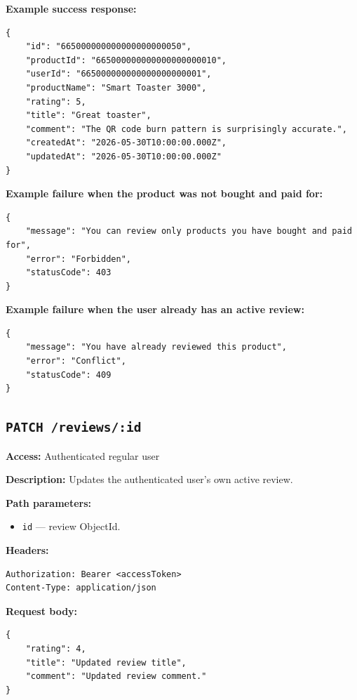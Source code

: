\pagebreak
\textbf{Example success response:}

\begin{verbatim}
{
    "id": "665000000000000000000050",
    "productId": "665000000000000000000010",
    "userId": "665000000000000000000001",
    "productName": "Smart Toaster 3000",
    "rating": 5,
    "title": "Great toaster",
    "comment": "The QR code burn pattern is surprisingly accurate.",
    "createdAt": "2026-05-30T10:00:00.000Z",
    "updatedAt": "2026-05-30T10:00:00.000Z"
}
\end{verbatim}

\textbf{Example failure when the product was not bought and paid for:}

\begin{verbatim}
{
    "message": "You can review only products you have bought and paid for",
    "error": "Forbidden",
    "statusCode": 403
}
\end{verbatim}

\textbf{Example failure when the user already has an active review:}

\begin{verbatim}
{
    "message": "You have already reviewed this product",
    "error": "Conflict",
    "statusCode": 409
}
\end{verbatim}

\subsection{\texttt{PATCH /reviews/:id}}

\textbf{Access:} Authenticated regular user

\textbf{Description:} Updates the authenticated user's own active review.

\textbf{Path parameters:}

\begin{itemize}
    \item \texttt{id} --- review ObjectId.
\end{itemize}

\textbf{Headers:}

\begin{verbatim}
Authorization: Bearer <accessToken>
Content-Type: application/json
\end{verbatim}

\pagebreak
\textbf{Request body:}

\begin{verbatim}
{
    "rating": 4,
    "title": "Updated review title",
    "comment": "Updated review comment."
}
\end{verbatim}

